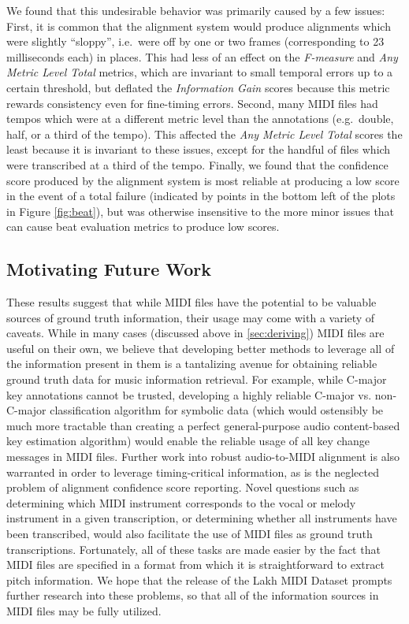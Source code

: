 We found that this undesirable behavior was primarily caused by a few issues:
First, it is common that the alignment system would produce alignments which were slightly ``sloppy'', i.e.\ were off by one or two frames (corresponding to 23 milliseconds each) in places.
This had less of an effect on the {\em F-measure} and {\em Any Metric Level Total} metrics, which are invariant to small temporal errors up to a certain threshold, but deflated the {\em Information Gain} scores because this metric rewards consistency even for fine-timing errors.
Second, many MIDI files had tempos which were at a different metric level than the annotations (e.g.\ double, half, or a third of the tempo).
This affected the {\em Any Metric Level Total} scores the least because it is invariant to these issues, except for the handful of files which were transcribed at a third of the tempo.
Finally, we found that the confidence score produced by the alignment system is most reliable at producing a low score in the event of a total failure (indicated by points in the bottom left of the plots in Figure \ref{fig:beat}), but was otherwise insensitive to the more minor issues that can cause beat evaluation metrics to produce low scores.

\subsection{Motivating Future Work}

These results suggest that while MIDI files have the potential to be valuable sources of ground truth information, their usage may come with a variety of caveats.
While in many cases (discussed above in \cref{sec:deriving}) MIDI files are useful on their own, we believe that developing better methods to leverage all of the information present in them is a tantalizing avenue for obtaining reliable ground truth data for music information retrieval.
For example, while C-major key annotations cannot be trusted, developing a highly reliable C-major vs. non-C-major classification algorithm for symbolic data (which would ostensibly be much more tractable than creating a perfect general-purpose audio content-based key estimation algorithm) would enable the reliable usage of all key change messages in MIDI files.
Further work into robust audio-to-MIDI alignment is also warranted in order to leverage timing-critical information, as is the neglected problem of alignment confidence score reporting.
Novel questions such as determining which MIDI instrument corresponds to the vocal or melody instrument in a given transcription, or determining whether all instruments have been transcribed, would also facilitate the use of MIDI files as ground truth transcriptions.
Fortunately, all of these tasks are made easier by the fact that MIDI files are specified in a format from which it is straightforward to extract pitch information.
We hope that the release of the Lakh MIDI Dataset prompts further research into these problems, so that all of the information sources in MIDI files may be fully utilized.

